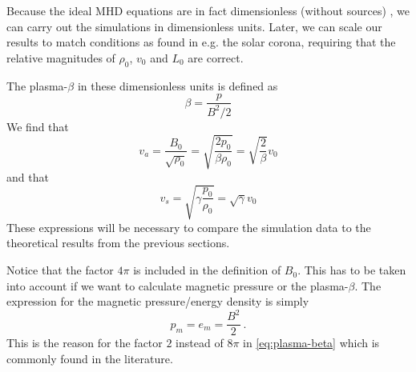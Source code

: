 Because the ideal MHD equations are in fact dimensionless (without sources) , we can carry out the simulations in dimensionless units. Later, we can scale our results to match conditions as found in e.g. the solar corona, requiring that the relative magnitudes of $\rho_0$, $v_0$ and $L_0$ are correct.

The plasma-$\beta$ in these dimensionless units is defined as
\begin{equation}
	\beta = \frac{p}{B^2/2}
	\label{eq:plasma-beta}
\end{equation}
We find that
\begin{equation}
	v_a = \frac{B_0}{\sqrt{\rho_0}} = \sqrt{ \frac{2p_0}{\beta\rho_0}} = \sqrt{ \frac{2}{\beta}}v_0
	\label{eq:Alfven-code-units}
\end{equation}
and that
\begin{equation}
	v_s = \sqrt{ \gamma\frac{p_0}{\rho_0}} = \sqrt{\gamma}v_0
	\label{eq:sound-code-units}
\end{equation}
These expressions will be necessary to compare the simulation data to the theoretical results from the previous sections.

Notice that the factor $4\pi$ is included in the definition of $B_0$. This has to be taken into account if we want to calculate magnetic pressure or the plasma-$\beta$.
The expression for the magnetic pressure/energy density is simply
\begin{equation}
	p_m = e_m = \frac{B^2}{2} \ .
	\label{eq:magnetic-pressure}
\end{equation}
This is the reason for the factor $2$ instead of $8\pi$ in \cref{eq:plasma-beta} which is commonly found in the literature.

